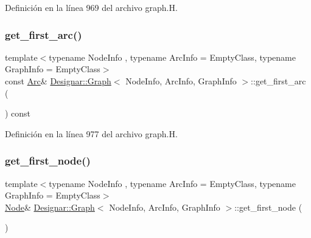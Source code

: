 Definición en la línea 969 del archivo graph.\+H.

\mbox{\label{class_designar_1_1_graph_a3a4be7fef798a957b0a66102f1d30c39}} 
\subsubsection{\texorpdfstring{get\+\_\+first\+\_\+arc()}{get\_first\_arc()}\hspace{0.1cm}{\footnotesize\ttfamily [2/2]}}
{\footnotesize\ttfamily template$<$typename Node\+Info , typename Arc\+Info  = Empty\+Class, typename Graph\+Info  = Empty\+Class$>$ \\
const \hyperlink{class_designar_1_1_graph_a74c730ef4ce2d20f998d72bd25c2b5bf}{Arc}\& \hyperlink{class_designar_1_1_graph}{Designar\+::\+Graph}$<$ Node\+Info, Arc\+Info, Graph\+Info $>$\+::get\+\_\+first\+\_\+arc (\begin{DoxyParamCaption}{ }\end{DoxyParamCaption}) const\hspace{0.3cm}{\ttfamily [inline]}}



Definición en la línea 977 del archivo graph.\+H.

\mbox{\label{class_designar_1_1_graph_ab9f34a6b6160f9e66a3103c78b13d7d6}} 
\subsubsection{\texorpdfstring{get\+\_\+first\+\_\+node()}{get\_first\_node()}\hspace{0.1cm}{\footnotesize\ttfamily [1/2]}}
{\footnotesize\ttfamily template$<$typename Node\+Info , typename Arc\+Info  = Empty\+Class, typename Graph\+Info  = Empty\+Class$>$ \\
\hyperlink{class_designar_1_1_graph_a5dfc7dba9d092ac489c72e40390c37d0}{Node}\& \hyperlink{class_designar_1_1_graph}{Designar\+::\+Graph}$<$ Node\+Info, Arc\+Info, Graph\+Info $>$\+::get\+\_\+first\+\_\+node (\begin{DoxyParamCaption}{ }\end{DoxyParamCaption})\hspace{0.3cm}{\ttfamily [inline]}}



